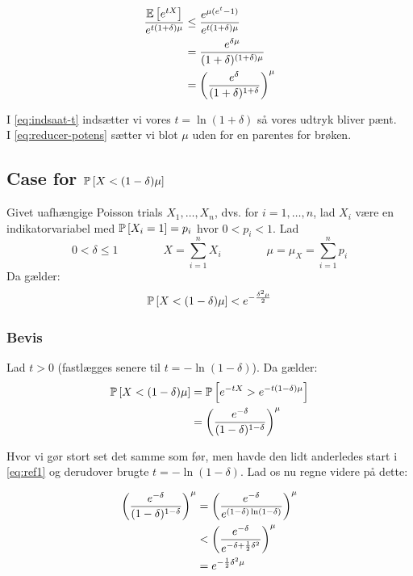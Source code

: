 \begin{align}
  \frac{\E{e^{tX}}}{e^{t(1+\delta) \mu}}
  &\leq \frac{e^{\mu (e^t - 1)}}{e^{t(1+\delta) \mu}}\\
  &= \frac{e^{\delta \mu}}{(1 + \delta)^{(1 + \delta) \mu}} \label{eq:indsaat-t} \\
  &= \pfrac{e^\delta}{(1 + \delta)^{1 + \delta}}^\mu \label{eq:reducer-potens}
\end{align}

I \cref{eq:indsaat-t} indsætter vi vores $t = \ln(1 + \delta)$ så vores udtryk bliver pænt.\\
I \cref{eq:reducer-potens} sætter vi blot $\mu$ uden for en parentes for brøken.



\subsection{Case for $\P{X < (1 - \delta) \mu}$}
Givet uafhængige Poisson trials $X_1, \dots, X_n$, dvs. for $i = 1, \dots, n$, lad $X_i$ være en indikatorvariabel med $\P{X_i = 1} = p_i$ hvor $0 < p_i < 1$. Lad
$$
0 < \delta \leq 1
\quad\quad\quad\quad
X = \sum_{i=1}^n X_i
\quad\quad\quad\quad
\mu = \mu_X = \sum_{i=1}^n p_i
$$
Da gælder:
\begin{align}
  \P{X < (1 - \delta) \mu} < e^{- \frac{\delta^2 \mu}{2}} \label{eq:chernoff-2}
\end{align}


\subsubsection{Bevis}
Lad $t > 0$ (fastlægges senere til $t = - \ln(1 - \delta)$). Da gælder:
\begin{align}
  \P{X < (1 - \delta) \mu}
  &= \P{e^{- t X} > e^{-t (1 - \delta) \mu} } \label{eq:ref1} \\
  &= \pfrac{e^{-\delta}}{(1 - \delta)^{1 - \delta}}^\mu \nonumber
\end{align}

Hvor vi gør stort set det samme som før, men havde den lidt anderledes start i \cref{eq:ref1} og derudover brugte $t = -\ln(1 - \delta)$. Lad os nu regne videre på dette:


\begin{align}
  \pfrac{e^{-\delta}}{(1 - \delta)^{1 - \delta}}^\mu
  &= \pfrac{e^{-\delta}}{e^{(1 - \delta) \ln (1 - \delta)}}^\mu \label{eq:omskriver} \\
  &< \pfrac{e^{- \delta}}{e^{- \delta + \frac{1}{2} \delta^2}}^\mu \label{eq:mclaurin} \\
  &= e^{- \frac{1}{2} \delta^2 \mu} \label{eq:pot-regne-regler}
\end{align}

